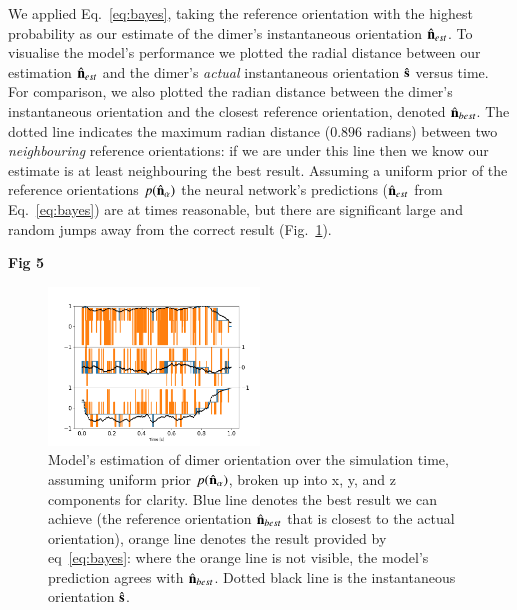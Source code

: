 \documentclass[final,  3p]{elsarticle}
\begin{document}
We applied Eq.~\eqref{eq:bayes}, taking the reference orientation with the highest probability  as our estimate of the dimer's instantaneous orientation $\hat{\bf n}_{est}$. To visualise the model's performance  we plotted the radial distance between our estimation $\hat{\bf n}_{est}$ and the dimer's \emph{actual} instantaneous orientation $\hat{\bf s}$ versus time. For comparison, we also plotted the radian distance between the  dimer's instantaneous orientation and the closest reference orientation, denoted $\hat{\bf n}_{best}$. The dotted line indicates the maximum radian distance ($0.896$ radians) between two \textit{neighbouring} reference orientations: if we are under this line then we know our estimate is at least neighbouring the best result. Assuming a uniform prior of the reference orientations $p(\hat{\bf n}_\alpha)$  the neural network's predictions ($\hat{\bf n}_{est}$ from Eq.~\eqref{eq:bayes}) are at times reasonable, but there are significant large and random jumps away from the correct result (Fig.~\ref{fig:uniform}). 

\begin{center}
	\bf{Fig 5}
\end{center}
\begin{figure}[h]
	\centering
	\includegraphics[width=0.5\textwidth]{./Images/fig5.png}
	\caption{Model's estimation of dimer orientation over the simulation time, assuming uniform prior $p(\hat{\bf n}_\alpha)$, broken up into x, y, and z components for clarity. Blue line denotes the best result we can achieve (the reference orientation $\hat{\bf n}_{best}$ that is closest to the actual orientation), orange line denotes the result provided by eq~\ref{eq:bayes}: where the orange line is not visible, the model's prediction agrees with $\hat{\bf n}_{best}$. Dotted black line is the instantaneous orientation $\hat{\bf s}$.}
	\label{fig:uniform}
\end{figure} 
\end{document}
